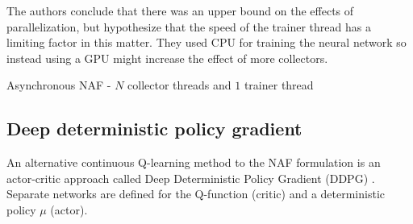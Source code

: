 The authors conclude that there was an upper bound on the effects of
parallelization, but hypothesize that the speed of the trainer thread has a
limiting factor in this matter. They used CPU for training the neural network
so instead using a GPU might increase the effect of more collectors.

\begin{algorithm}[!h]
    \caption{Asynchronous NAF - $N$ collector threads and $1$ trainer thread}
    \begin{algorithmic}
        \ENDFOR
            \ENDFOR
        \ENDFOR
    \end{algorithmic}
    \label{algo:async_naf}
\end{algorithm}

\subsection{Deep deterministic policy gradient}
\label{sec:ddpg}

An alternative continuous Q-learning method to the NAF formulation is an
actor-critic approach called Deep Deterministic Policy Gradient (DDPG)
\cite{lillicrap2015continuous}. Separate networks are defined for the
Q-function (critic) and a deterministic policy $\mu$ (actor).

